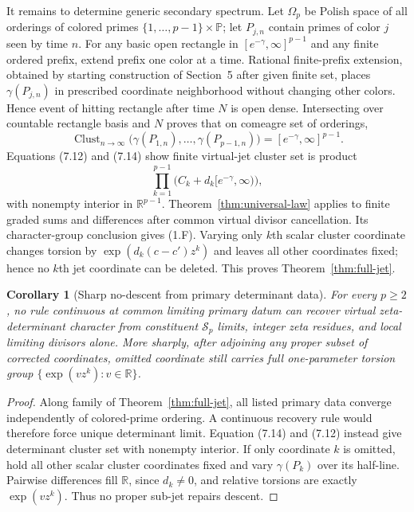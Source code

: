 \documentclass[11pt]{article}
\newtheorem{corollary}[theorem]{Corollary}
\theoremstyle{definition}
\theoremstyle{remark}
\newcommand{\R}{\mathbb R}
\newcommand{\PP}{\mathbb P}
\begin{document}
It remains to determine generic secondary spectrum.  Let $\Omega_p$ be Polish space of all
orderings of colored primes $\{1,\ldots,p-1\}\times\PP$; let $P_{j,n}$ contain primes of color
$j$ seen by time $n$.  For any basic open rectangle in
$[e^{-\gamma},\infty]^{p-1}$ and any finite ordered prefix, extend prefix one color at a time.
Rational finite-prefix extension, obtained by starting construction of Section~5 after given
finite set, places $\gamma(P_{j,n})$ in prescribed coordinate neighborhood without changing
other colors.  Hence event of hitting rectangle after time $N$ is open dense.  Intersecting over
countable rectangle basis and $N$ proves that on comeagre set of orderings,
\begin{equation}
 \operatorname{Clust}_{n\to\infty}
   \bigl(\gamma(P_{1,n}),\ldots,\gamma(P_{p-1,n})\bigr)
 =[e^{-\gamma},\infty]^{p-1}.                            \tag{7.14}
\end{equation}
Equations (7.12) and (7.14) show finite virtual-jet cluster set is product
\[
 \prod_{k=1}^{p-1}\bigl(C_k+d_k[e^{-\gamma},\infty)\bigr),
\]
with nonempty interior in $\R^{p-1}$.  Theorem~\ref{thm:universal-law} applies to finite graded
sums and differences after common virtual divisor cancellation.  Its character-group conclusion
gives (1.F).  Varying only $k$th scalar cluster coordinate changes torsion by
$\exp(d_k(c-c')z^k)$ and leaves all other coordinates fixed; hence no $k$th jet coordinate can
be deleted.  This proves Theorem~\ref{thm:full-jet}.

\begin{corollary}[Sharp no-descent from primary determinant data]
\label{cor:full-no-descent}
For every $p\geq2$, no rule continuous at common limiting primary datum can recover virtual
zeta-determinant character from constituent $\mathcal S_p$ limits, integer zeta residues, and
local limiting divisors alone.  More sharply, after adjoining any proper subset of corrected
coordinates, omitted coordinate still carries full one-parameter torsion group
$\{\exp(vz^k):v\in\R\}$.
\end{corollary}

\begin{proof}
Along family of Theorem~\ref{thm:full-jet}, all listed primary data converge independently of
colored-prime ordering.  A continuous recovery rule would therefore force unique determinant
limit.  Equation (7.14) and (7.12) instead give determinant cluster set with nonempty interior.
If only coordinate $k$ is omitted, hold all other scalar cluster coordinates fixed and vary
$\gamma(P_k)$ over its half-line.  Pairwise differences fill $\R$, since $d_k\neq0$, and
relative torsions are exactly $\exp(vz^k)$.  Thus no proper sub-jet repairs descent.
\end{proof}
\end{document}
